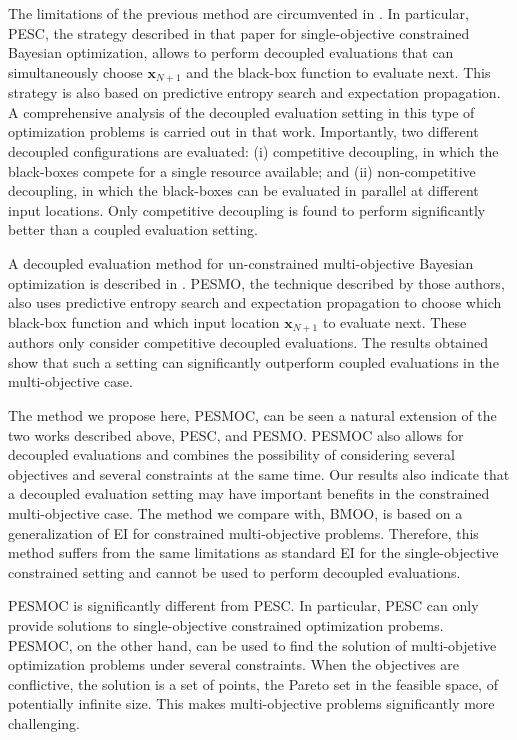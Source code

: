 \documentclass[review,preprint,12pt]{elsarticle}
\begin{document}
The limitations of the previous method are circumvented in \citep{hernandez2016general}. In particular,
PESC, the strategy described in that paper for single-objective constrained Bayesian optimization, allows
to perform decoupled evaluations that can simultaneously choose $\mathbf{x}_{N+1}$ and the black-box function
to evaluate next. This strategy is also based on predictive entropy search and expectation propagation.
A comprehensive analysis of the decoupled evaluation setting in this type of optimization problems is carried
out in that work. Importantly, two different decoupled configurations are evaluated: (i) competitive decoupling, 
in which the black-boxes compete for a single resource available; and (ii) non-competitive decoupling, in which the 
black-boxes can be evaluated in parallel at different input locations. Only competitive decoupling is 
found to perform significantly better than a coupled evaluation setting.

A decoupled evaluation method for un-constrained multi-objective Bayesian optimization is described in
\citep{hernandez2016predictive}. PESMO, the technique described by those authors, also uses predictive entropy 
search and expectation propagation to choose which black-box function and which input location 
$\mathbf{x}_{N+1}$ to evaluate next. These authors only consider competitive decoupled evaluations. The results obtained 
show that such a setting can significantly outperform coupled evaluations in the multi-objective case. 

The method we propose here, PESMOC, can be seen a natural extension of the two works described above, 
PESC, and PESMO. PESMOC also allows for decoupled evaluations and combines the possibility of considering several 
objectives and several constraints at the same time. Our results also indicate that a decoupled evaluation setting
may have important benefits in the constrained multi-objective case. The method we compare with, BMOO, is based
on a generalization of EI for constrained multi-objective problems. Therefore, this method suffers from the same 
limitations as standard EI for the single-objective constrained setting and cannot be used to perform decoupled evaluations.

PESMOC is significantly different from PESC. In particular, PESC can only provide solutions to
single-objective constrained optimization probems. PESMOC, on the other hand, can be used to find the solution 
of multi-objetive optimization problems under several constraints. When the objectives are conflictive, the solution 
is a set of points, the Pareto set in the feasible space, of potentially infinite size. This makes multi-objective problems significantly more challenging. 
\end{document}
